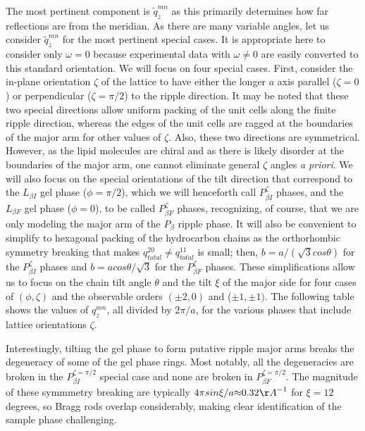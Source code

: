 \documentclass[
 preprint,
 showkeys, 
 amsmath,
 amssymb,
 aps,
]{revtex4-1}
\begin{document}
The most pertinent component is $\tilde{q}_z^{mn}$ as this primarily determines how far reflections are from the meridian.  As there are many variable angles, let us consider $\tilde{q}_z^{mn}$ for the most pertinent special cases.  It is appropriate here to consider only $\omega=0$ because experimental data with $\omega{\neq}0$ are easily converted to this standard orientation.  We will focus on four special cases.  First, consider the in-plane orientation ${\zeta}$ of the lattice to have either the longer $a$ axis parallel (${\zeta}=0$) or perpendicular (${\zeta}={\pi}/2$) to the ripple direction.  It may be noted that these two special directions allow uniform packing of the unit cells along the finite ripple direction, whereas the edges of the unit cells are ragged at the boundaries of the major arm for other values of ${\zeta}$.  Also, these two directions are symmetrical.  However, as the lipid molecules are chiral and as there is likely disorder at the boundaries of the major arm, one cannot eliminate general ${\zeta}$ angles {\it a priori}.  We will also focus on the special orientations of the tilt direction that correspond to the $L_{{\beta}I}$ gel phase ($\phi=\pi/2$), which we will henceforth call $P_{{\beta}I}^{\zeta}$ phases, and the $L_{{\beta}F}$ gel phase ($\phi=0$), to be called $P_{{\beta}F}^{\zeta}$ phases, recognizing, of course, that we are only modeling the major arm of the $P_{\beta}$ ripple phase.   It will also be convenient to simplify to hexagonal packing of the hydrocarbon chains as the orthorhombic symmetry breaking that makes $q_{total}^{20}{\neq}q_{total}^{11}$ is small; then, $b=a/(\sqrt{3}cos{\theta})$ for the $P_{{\beta}I}^{\zeta}$ phases and $b=acos{\theta}/\sqrt{3}$ for the $P_{{\beta}F}^{\zeta}$ phases.  These simplifications allow us to focus on the chain tilt angle $\theta$ and the tilt $\xi$ of the major side for four cases of $(\phi,\zeta)$ and the observable orders $({\pm}2,0)$ and (${\pm}1,{\pm}1)$.  The following table shows the values of $q_z^{mn}$, all divided by $2\pi/a$, for the various phases that include lattice orientations $\zeta$.  

Interestingly, tilting the gel phase to form putative ripple major arms breaks the degeneracy of some of the gel phase rings.  Most notably, all the degeneracies are broken in the $P_{{\beta}I}^{\zeta=\pi/2}$ special case and none are broken in $P_{{\beta}F}^{\zeta=\pi/2}$.  The magnitude of these symmmetry breaking are typically $4{\pi}sin{\xi}/a {\approx} 0.32 {\AA}^{-1}$  for $\xi=12$ degrees, so Bragg rods overlap considerably, making clear identification of the sample phase challenging.
\vspace{0.5cm}
\end{document}
